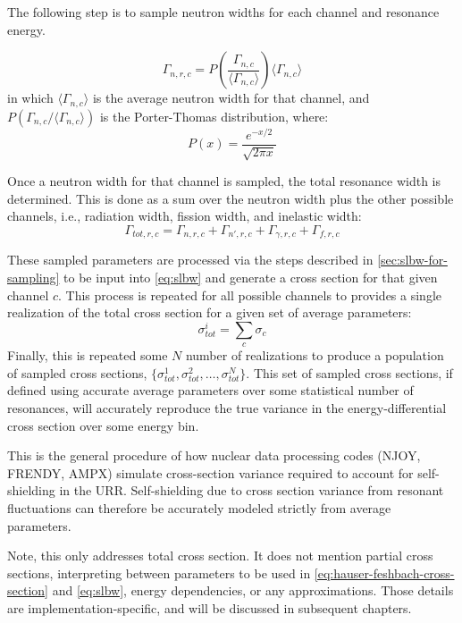 The following step is to sample neutron widths for each channel and resonance energy.

\begin{equation}
    \label{eq:porter-thomas}
    \Gamma_{n,r,c} = P\left( \frac{\Gamma_{n,c}}{\langle \Gamma_{n,c}  \rangle}\right)\langle \Gamma_{n,c}  \rangle
\end{equation}
in which $\langle \Gamma_{n,c}  \rangle$ is the average neutron width for that channel, and $P\left( \Gamma_{n,c} / \langle \Gamma_{n,c}  \rangle \right)$ is the Porter-Thomas distribution, where:
\begin{equation}
    P(x) = \frac{e^{-x/2}}{\sqrt{2\pi x}}
\end{equation}

Once a neutron width for that channel is sampled, the total resonance width is determined. This is done as a sum over the neutron width plus the other possible channels, i.e., radiation width, fission width, and inelastic width:
\begin{equation}
    \Gamma_{tot,r,c} = \Gamma_{n,r,c} + \Gamma_{n',r,c} + \Gamma_{\gamma,r,c} + \Gamma_{f,r,c}
\end{equation}

These sampled parameters are processed via the steps described in \autoref{sec:slbw-for-sampling} to be input into \autoref{eq:slbw} and generate a cross section for that given channel $c$. This process is repeated for all possible channels to provides a single realization of the total cross section for a given set of average parameters:
\begin{equation}
    \sigma_{tot}^i = \sum_c \sigma_c
\end{equation}
Finally, this is repeated some $N$ number of realizations to produce a population of sampled cross sections, $\{ \sigma_{tot}^1, \sigma_{tot}^2, \ldots, \sigma_{tot}^{N} \}$. This set of sampled cross sections, if defined using accurate average parameters over some statistical number of resonances, will accurately reproduce the true variance in the energy-differential cross section over some energy bin.

This is the general procedure of how nuclear data processing codes (NJOY\cite{njoy}, FRENDY\cite{frendy}, AMPX\cite{scale2024manual}) simulate cross-section variance required to account for self-shielding in the URR. Self-shielding due to cross section variance from resonant fluctuations can therefore be accurately modeled strictly from average parameters.

Note, this only addresses total cross section. It does not mention partial cross sections, interpreting between parameters to be used in \autoref{eq:hauser-feshbach-cross-section} and \autoref{eq:slbw}, energy dependencies, or any approximations. Those details are implementation-specific, and will be discussed in subsequent chapters.
